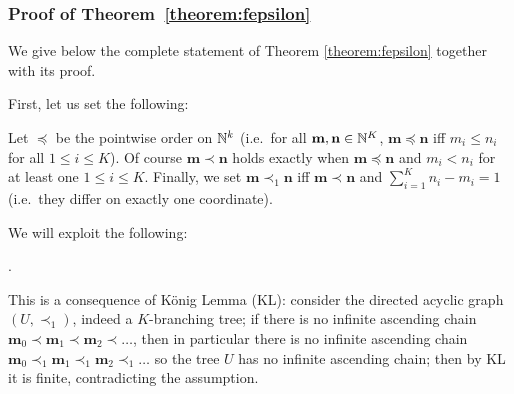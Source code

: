 \newpage

\subsubsection{Proof of Theorem~\ref{theorem:fepsilon}}

We give below the complete statement of Theorem \ref{theorem:fepsilon} together with its proof.

First, let us set the following:
\begin{definition}
 Let $\preceq$ be the pointwise order on $\mathbb{N}^k$ (i.e.\ for all $\mathbf m,\mathbf n\in \mathbb{N}^{K}$, $\mathbf m\preceq \mathbf n$ iff $m_{i}\leq n_{i}$ for all $1\leq i\leq K$).
 Of course $\mathbf m\prec \mathbf n$ holds exactly when $\mathbf m\preceq \mathbf n$ and $m_{i}<n_{i}$ for at least one $1\leq i\leq K$.
 Finally, we set $\mathbf m\prec_{1}\mathbf n$  iff
$\mathbf m\prec \mathbf n$ and $\sum_{i=1}^{K}n_{i}-m_{i}=1$ (i.e.\ they differ on exactly one coordinate).
\end{definition}

We will exploit the following:

\begin{remark}\label{rmk:AC}
.

This is a consequence of K\"onig Lemma (KL): consider the directed acyclic graph $(U,\prec_{1})$, indeed a $K$-branching tree; if there is no infinite ascending chain $ \mathbf m_{0}\prec \mathbf m_{1} \prec \mathbf m_{2} \prec \dots$, then in particular there is no infinite ascending chain $ \mathbf m_{0}\prec_{1} \mathbf m_{1} \prec_{1} \mathbf m_{2} \prec_{1} \dots$ so the tree $U$ has no infinite ascending chain; then by KL it is finite, contradicting the assumption. 
\end{remark}

